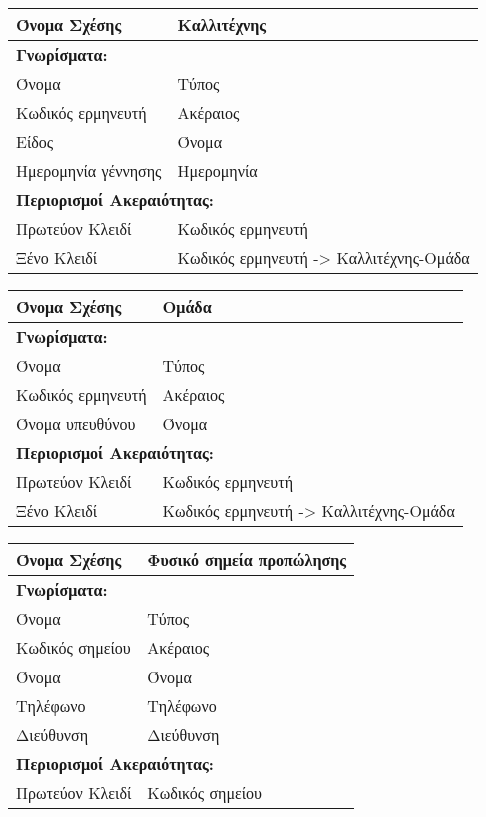 \begin{tabular}{|p{6cm}|p{8cm}|}
  \hline
  Όνομα Σχέσης        & Καλλιτέχνης                   \\ \hline
  \multicolumn{2}{|l|}{\textbf{Γνωρίσματα:}}               \\ \hline
  Όνομα               & Τύπος                              \\ \hline
  Κωδικός ερμηνευτή   & Ακέραιος                           \\ \hline
  Είδος               & Όνομα                              \\ \hline
  Ημερομηνία γέννησης & Ημερομηνία                         \\ \hline
  \multicolumn{2}{|l|}{\textbf{Περιορισμοί Ακεραιότητας:}} \\ \hline
  Πρωτεύον Κλειδί     & Κωδικός ερμηνευτή                  \\ \hline
  Ξένο Κλειδί         & Κωδικός ερμηνευτή -> Καλλιτέχνης-Ομάδα                  \\ \hline
\end{tabular}

\begin{tabular}{|p{6cm}|p{8cm}|}
  \hline
  Όνομα Σχέσης        & Ομάδα                   \\ \hline
  \multicolumn{2}{|l|}{\textbf{Γνωρίσματα:}}               \\ \hline
  Όνομα               & Τύπος                              \\ \hline
  Κωδικός ερμηνευτή   & Ακέραιος                           \\ \hline
  Όνομα υπευθύνου     & Όνομα                              \\ \hline
  \multicolumn{2}{|l|}{\textbf{Περιορισμοί Ακεραιότητας:}} \\ \hline
  Πρωτεύον Κλειδί     & Κωδικός ερμηνευτή                  \\ \hline
  Ξένο Κλειδί         & Κωδικός ερμηνευτή -> Καλλιτέχνης-Ομάδα                  \\ \hline
\end{tabular}


\begin{tabular}{|p{6cm}|p{8cm}|}
  \hline
  Όνομα Σχέσης    & Φυσικό σημεία προπώλησης               \\ \hline
  \multicolumn{2}{|l|}{\textbf{Γνωρίσματα:}}               \\ \hline
  Όνομα           & Τύπος                                  \\ \hline
  Κωδικός σημείου & Ακέραιος                               \\ \hline
  Όνομα           & Όνομα                                  \\ \hline
  Τηλέφωνο        & Τηλέφωνο                               \\ \hline
  Διεύθυνση       & Διεύθυνση                              \\ \hline
  \multicolumn{2}{|l|}{\textbf{Περιορισμοί Ακεραιότητας:}} \\ \hline
  Πρωτεύον Κλειδί & Κωδικός σημείου                        \\ \hline
\end{tabular}

